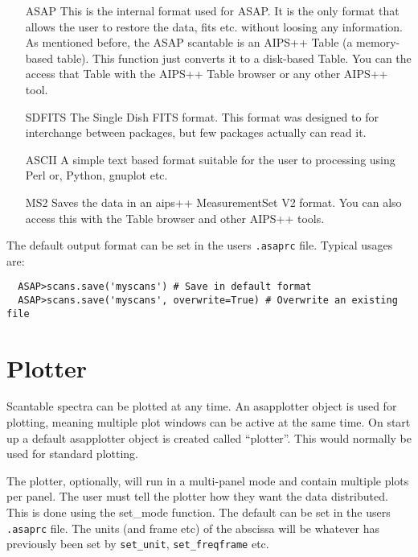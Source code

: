 \documentclass[11pt]{article}
\newcommand{\cmd}[1]{{\tt #1}}
\begin{document}
\begin{itemize}
\item[ASAP] This is the internal format used for ASAP. It is the only
  format that allows the user to restore the data, fits etc. without
  loosing any information.  As mentioned before, the ASAP scantable is
  an AIPS++ Table (a memory-based table).  This function just converts
  it to a disk-based Table.  You can the access that Table with the
  AIPS++ Table browser or any other AIPS++ tool.

\item[SDFITS] The Single Dish FITS format. This format was designed to
  for interchange between packages, but few packages actually can read
  it.


\item[ASCII] A simple text based format suitable for the user to
processing using Perl or, Python, gnuplot etc.

\item[MS2] Saves the data in an aips++ MeasurementSet V2 format.
You can also access this with the Table browser and other AIPS++
tools.

\end{itemize}

The default output format can be set in the users {\tt .asaprc} file.
Typical usages are:

\begin{verbatim}
  ASAP>scans.save('myscans') # Save in default format
  ASAP>scans.save('myscans', overwrite=True) # Overwrite an existing file
\end{verbatim}

\section{Plotter}

Scantable spectra can be plotted at any time. An
asapplotter object is used for plotting, meaning multiple plot windows
can be active at the same time. On start up a default asapplotter
object is created called ``plotter''. This would normally be used for
standard plotting.

The plotter, optionally, will run in a multi-panel mode and contain
multiple plots per panel. The user must tell the plotter how they want
the data distributed. This is done using the set\_mode function. The
default can be set in the users {\tt .asaprc} file. The units (and frame
etc) of the abscissa will be whatever has previously been set by
\cmd{set\_unit}, \cmd{set\_freqframe} etc.
\end{document}
